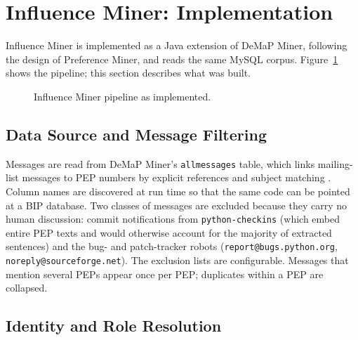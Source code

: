 \documentclass[sigconf,screen]{acmart}
\begin{document}
\section{Influence Miner: Implementation}

Influence Miner is implemented as a Java extension of DeMaP Miner, following the design of Preference Miner, and reads the same MySQL corpus. Figure~\ref{fig:pipeline} shows the pipeline; this section describes what was built.

\begin{figure}
  \centering
  \caption{Influence Miner pipeline as implemented.}
  \label{fig:pipeline}
\end{figure}

\subsection{Data Source and Message Filtering}

Messages are read from DeMaP Miner's \texttt{allmessages} table, which links mailing-list messages to PEP numbers by explicit references and subject matching \cite{sharma2022demap}. Column names are discovered at run time so that the same code can be pointed at a BIP database. Two classes of messages are excluded because they carry no human discussion: commit notifications from \texttt{python-checkins} (which embed entire PEP texts and would otherwise account for the majority of extracted sentences) and the bug- and patch-tracker robots (\texttt{report@bugs.python.org}, \texttt{noreply@sourceforge.net}). The exclusion lists are configurable. Messages that mention several PEPs appear once per PEP; duplicates within a PEP are collapsed.

\subsection{Identity and Role Resolution}
\end{document}
